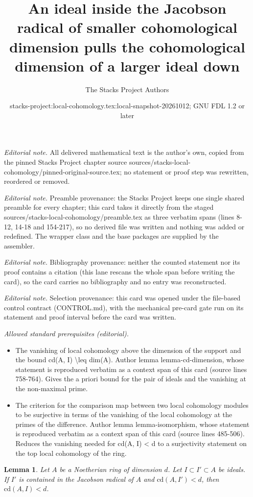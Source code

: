 \documentclass[10pt,a4paper]{amsart}
\title{An ideal inside the Jacobson radical of smaller cohomological dimension pulls the cohomological dimension of a larger ideal down}
\author{The Stacks Project Authors}
\date{stacks-project:local-cohomology.tex:local-snapshot-20261012; GNU FDL 1.2 or later}
\theoremstyle{plain}
\newtheorem{lemma}[subsection]{Lemma}
\theoremstyle{definition}
\theoremstyle{remark}
\numberwithin{equation}{subsection}
\begin{document}
\maketitle
\noindent\textit{Editorial note.} All delivered mathematical text is the author's own, copied from the pinned Stacks Project chapter source sources/stacks-local-cohomology/pinned-original-source.tex; no statement or proof step was rewritten, reordered or removed.\par\medskip
\noindent\textit{Editorial note.} Preamble provenance: the Stacks Project keeps one single shared preamble for every chapter; this card takes it directly from the staged sources/stacks-local-cohomology/preamble.tex as three verbatim spans (lines 8-12, 14-18 and 154-217), so no derived file was written and nothing was added or redefined. The wrapper class and the base packages are supplied by the assembler.\par\medskip
\noindent\textit{Editorial note.} Bibliography provenance: neither the counted statement nor its proof contains a citation (this lane rescans the whole span before writing the card), so the card carries no bibliography and no entry was reconstructed.\par\medskip
\noindent\textit{Editorial note.} Selection provenance: this card was opened under the file-based control contract (CONTROL.md), with the mechanical pre-card gate run on its statement and proof interval before the card was written.\par\medskip
\noindent\textit{Allowed standard prerequisites (editorial).}\begin{itemize}
\item The vanishing of local cohomology above the dimension of the support and the bound cd(A, I) \textbackslash{}leq dim(A). Author lemma lemma-cd-dimension, whose statement is reproduced verbatim as a context span of this card (source lines 758-764). Gives the a priori bound for the pair of ideals and the vanishing at the non-maximal prime.
\item The criterion for the comparison map between two local cohomology modules to be surjective in terms of the vanishing of the local cohomology at the primes of the difference. Author lemma lemma-isomorphism, whose statement is reproduced verbatim as a context span of this card (source lines 485-506). Reduces the vanishing needed for cd(A, I) < d to a surjectivity statement on the top local cohomology of the ring.
\end{itemize}\medskip
\begin{lemma}
\label{lemma-cd-top-vanishing}
Let $A$ be a Noetherian ring of dimension $d$. Let $I \subset I' \subset A$
be ideals. If $I'$ is contained in the Jacobson radical
of $A$ and $\text{cd}(A, I') < d$, then $\text{cd}(A, I) < d$.
\end{lemma}
\end{document}
